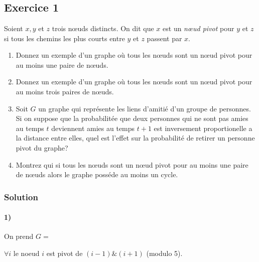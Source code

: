 \section{}




\subsection*{Exercice 1}
Soient $x, y$ et $z$ trois n\oe{}uds distincts. On dit que $x$ est un \emph{n\oe{}ud pivot} pour $y$ et $z$ si tous les chemins les plus courts entre $y$ et $z$ passent par $x$.

\begin{enumerate}
\item Donnez un exemple d'un graphe o\`{u} tous les n\oe{}uds sont un n\oe{}ud pivot pour au moins une paire de n\oe{}uds.
\item Donnez un exemple d'un graphe o\`{u} tous les n\oe{}uds sont un n\oe{}ud pivot pour au moins trois paires de n\oe{}uds.
\item Soit $G$ un graphe qui repr\'{e}sente les liens d'amiti\'{e} d'un groupe de personnes. Si on suppose que la probabilit\'{e}e que deux personnes qui ne sont pas amies au 
temps $t$ deviennent amies au temps $t + 1$ est inversement proportionelle a la distance entre elles, quel est l'effet sur la probabilit\'{e} de retirer un personne pivot du graphe? 
\item Montrez qui si tous les n\oe{}uds sont un n\oe{}ud pivot pour au moins une paire de n\oe{}uds alors le graphe poss\'{e}de au moins un cycle.
\end{enumerate}

\subsubsection*{Solution}

\paragraph{1)} On prend $G = $
\begin{center}  
\end{center}
$\forall i$ le noeud $i$ est pivot de $(i-1)\&(i+1)$ (modulo 5).

